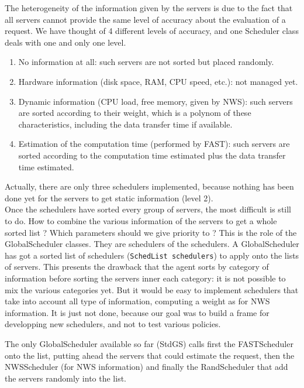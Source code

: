   The heterogeneity of the information given by the servers is due to the fact
  that all servers cannot provide the same level of accuracy about the evaluation
  of a request. We have thought of 4 different levels of accuracy, and one
  \textsf{Scheduler} class deals with one and only one level.
  \begin{enumerate}
  \item No information at all: such servers are not sorted but placed randomly.
  \item Hardware information (disk space, RAM, CPU speed, etc.): not managed yet.
  \item Dynamic information (CPU load, free memory, given by NWS): such servers
  are sorted according to their weight, which is a polynom of these
  characteristics, including the data transfer time if available.
  \item Estimation of the computation time (performed by FAST): such servers
  are sorted according to the computation time estimated plus the data transfer
  time estimated.
  \end{enumerate}

  Actually, there are only three schedulers implemented, because nothing has been
  done yet for the servers to get static information (level 2).
  \\

  Once the schedulers have sorted every group of servers, the most difficult is
  still to do. How to combine the various information of the servers to get a
  whole sorted list ? Which parameters should we give priority to ? This is the
  role of the \textsf{GlobalScheduler} classes. They are schedulers of the
  schedulers. A \textsf{GlobalScheduler} has got a sorted list of schedulers
  (\texttt{SchedList schedulers}) to apply onto the lists of servers. This
  presents the drawback that the agent sorts by category of information before
  sorting the servers inner each category: it is not possible to mix the various
  categories yet. But it would be easy to implement schedulers that take into
  account all type of information, computing a weight as for NWS information. It
  is just not done, because our goal was to build a frame for developping new
  schedulers, and not to test various policies.

  The only \textsf{GlobalScheduler} available so far (\textsf{StdGS}) calls first
  the \textsf{FASTScheduler} onto the list, putting ahead the servers that could
  estimate the request, then the \textsf{NWSScheduler} (for NWS information) and
  finally the \textsf{RandScheduler} that add the servers randomly into the list.
  \\


